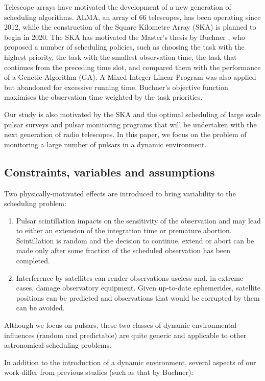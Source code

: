 \documentclass{article}
\begin{document}
Telescope arrays have motivated the development of a new generation of scheduling algorithms. 
ALMA, an array of 66 telescopes, has been operating since 2012,
while the construction of the Square Kilometre Array (SKA) is planned to begin in
2020. The SKA has motivated the Master’s thesis by Buchner \cite{buchner2011dynamic}, who proposed a
number of scheduling policies, such as choosing the task with the highest priority, the
task with the smallest observation time, the task that continues from the preceding
time slot, and compared them with the performance of a Genetic Algorithm (GA). A
Mixed-Integer Linear Program was also applied but abandoned for excessive running
time. Buchner’s objective function maximises the observation time weighted by the
task priorities.

Our study is also motivated by the SKA and the optimal scheduling of large scale
pulsar surveys and pulsar monitoring programs that will be undertaken with the next
generation of radio telescopes. In this paper, we focus on the problem of monitoring a
large number of pulsars in a dynamic environment. 

\subsection*{Constraints, variables and assumptions}

Two physically-motivated effects
are introduced to bring variability to the scheduling problem:
\begin{enumerate}
    \item Pulsar scintillation impacts on the sensitivity of the observation and may lead to
    either an extension of the integration time or premature abortion. Scintillation
    is random and the decision to continue, extend or abort can be made only after
    some fraction of the scheduled observation has been completed.
    \item  Interference by satellites can render observations useless and, in extreme cases,
    damage observatory equipment. Given up-to-date ephemerides, satellite positions
    can be predicted and observations that would be corrupted by them can be avoided.
\end{enumerate}

Although we focus on pulsars, these two classes of dynamic environmental 
influences (random and predictable) are quite generic and applicable to 
other astronomical scheduling problems.

In addition to the introduction of a dynamic environment, several aspects of our
work differ from previous studies (such as that by Buchner):
\end{document}

